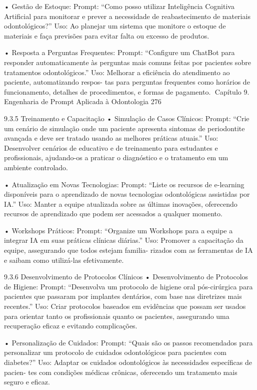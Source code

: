    • Gestão de Estoque:
      Prompt: “Como posso utilizar Inteligência Cognitiva Artificial para monitorar e
      prever a necessidade de reabastecimento de materiais odontológicos?”
      Uso: Ao planejar um sistema que monitore o estoque de materiais e faça previsões
      para evitar falta ou excesso de produtos.

    • Resposta a Perguntas Frequentes:
      Prompt: “Configure um ChatBot para responder automaticamente às perguntas
      mais comuns feitas por pacientes sobre tratamentos odontológicos.”
      Uso: Melhorar a eficiência do atendimento ao paciente, automatizando respos-
      tas para perguntas frequentes como horários de funcionamento, detalhes de
      procedimentos, e formas de pagamento.
Capítulo 9. Engenharia de Prompt Aplicada à Odontologia                            276


9.3.5    Treinamento e Capacitação
    • Simulação de Casos Clínicos:
      Prompt: “Crie um cenário de simulação onde um paciente apresenta sintomas de
      periodontite avançada e deve ser tratado usando as melhores práticas atuais.”
      Uso: Desenvolver cenários de educativo e de treinamento para estudantes e
      profissionais, ajudando-os a praticar o diagnóstico e o tratamento em um ambiente
      controlado.

    • Atualização em Novas Tecnologias:
      Prompt: “Liste os recursos de e-learning disponíveis para o aprendizado de novas
      tecnologias odontológicas assistidas por IA.”
      Uso: Manter a equipe atualizada sobre as últimas inovações, oferecendo recursos
      de aprendizado que podem ser acessados a qualquer momento.

    • Workshops Práticos:
      Prompt: “Organize um Workshops para a equipe a integrar IA em suas práticas
      clínicas diárias.”
      Uso: Promover a capacitação da equipe, assegurando que todos estejam familia-
      rizados com as ferramentas de IA e saibam como utilizá-las efetivamente.

9.3.6    Desenvolvimento de Protocolos Clínicos
    • Desenvolvimento de Protocolos de Higiene:
      Prompt: “Desenvolva um protocolo de higiene oral pós-cirúrgica para pacientes
      que passaram por implantes dentários, com base nas diretrizes mais recentes.”
      Uso: Criar protocolos baseados em evidências que possam ser usados para
      orientar tanto os profissionais quanto os pacientes, assegurando uma recuperação
      eficaz e evitando complicações.

    • Personalização de Cuidados:
      Prompt: “Quais são os passos recomendados para personalizar um protocolo de
      cuidados odontológicos para pacientes com diabetes?”
      Uso: Adaptar os cuidados odontológicos às necessidades específicas de pacien-
      tes com condições médicas crônicas, oferecendo um tratamento mais seguro e
      eficaz.

